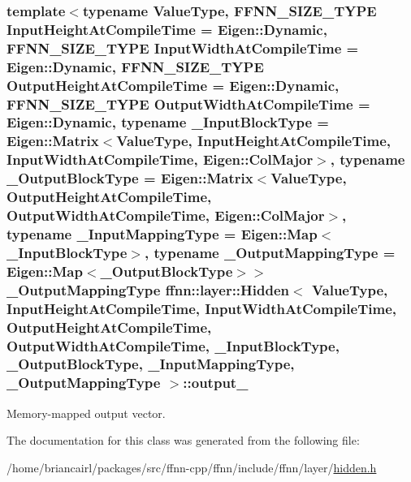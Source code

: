 \hypertarget{classffnn_1_1layer_1_1_hidden_a69245e9b3e1e9728ab12c69abf142bab}{
\subsubsection[{output\-\_\-}]{\setlength{\rightskip}{0pt plus 5cm}template$<$typename Value\-Type, F\-F\-N\-N\-\_\-\-S\-I\-Z\-E\-\_\-\-T\-Y\-P\-E Input\-Height\-At\-Compile\-Time = Eigen\-::\-Dynamic, F\-F\-N\-N\-\_\-\-S\-I\-Z\-E\-\_\-\-T\-Y\-P\-E Input\-Width\-At\-Compile\-Time = Eigen\-::\-Dynamic, F\-F\-N\-N\-\_\-\-S\-I\-Z\-E\-\_\-\-T\-Y\-P\-E Output\-Height\-At\-Compile\-Time = Eigen\-::\-Dynamic, F\-F\-N\-N\-\_\-\-S\-I\-Z\-E\-\_\-\-T\-Y\-P\-E Output\-Width\-At\-Compile\-Time = Eigen\-::\-Dynamic, typename \-\_\-\-Input\-Block\-Type = Eigen\-::\-Matrix$<$\-Value\-Type, Input\-Height\-At\-Compile\-Time, Input\-Width\-At\-Compile\-Time, Eigen\-::\-Col\-Major$>$, typename \-\_\-\-Output\-Block\-Type = Eigen\-::\-Matrix$<$\-Value\-Type, Output\-Height\-At\-Compile\-Time, Output\-Width\-At\-Compile\-Time, Eigen\-::\-Col\-Major$>$, typename \-\_\-\-Input\-Mapping\-Type = Eigen\-::\-Map$<$\-\_\-\-Input\-Block\-Type$>$, typename \-\_\-\-Output\-Mapping\-Type = Eigen\-::\-Map$<$\-\_\-\-Output\-Block\-Type$>$$>$ \-\_\-\-Output\-Mapping\-Type {\bf ffnn\-::layer\-::\-Hidden}$<$ Value\-Type, Input\-Height\-At\-Compile\-Time, Input\-Width\-At\-Compile\-Time, Output\-Height\-At\-Compile\-Time, Output\-Width\-At\-Compile\-Time, \-\_\-\-Input\-Block\-Type, \-\_\-\-Output\-Block\-Type, \-\_\-\-Input\-Mapping\-Type, \-\_\-\-Output\-Mapping\-Type $>$\-::output\-\_\-\hspace{0.3cm}{\ttfamily [protected]}}}\label{classffnn_1_1layer_1_1_hidden_a69245e9b3e1e9728ab12c69abf142bab}


Memory-\/mapped output vector. 



The documentation for this class was generated from the following file\-:\begin{DoxyCompactItemize}
\item 
/home/briancairl/packages/src/ffnn-\/cpp/ffnn/include/ffnn/layer/\hyperlink{hidden_8h}{hidden.\-h}\end{DoxyCompactItemize}
